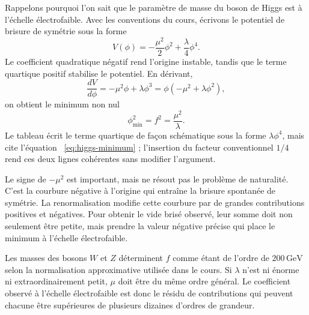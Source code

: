 \begin{classroomqa}
\end{classroomqa}

Rappelons pourquoi l’on sait que le paramètre de masse du boson de Higgs est à l’échelle électrofaible. Avec les conventions du cours, écrivons le potentiel de brisure de symétrie sous la forme
\begin{equation}
V(\phi)=-\frac{\mu^2}{2}\phi^2+\frac{\lambda}{4}\phi^4.
\label{eq:higgs-potential}
\end{equation}
Le coefficient quadratique négatif rend l’origine instable, tandis que le terme quartique positif stabilise le potentiel. En dérivant,
\begin{equation}
\frac{dV}{d\phi}=-\mu^2\phi+\lambda\phi^3
=\phi(-\mu^2+\lambda\phi^2),
\end{equation}
on obtient le minimum non nul
\begin{equation}
\phi_{\min}^2=f^2=\frac{\mu^2}{\lambda}.
\label{eq:higgs-minimum}
\end{equation}
Le tableau écrit le terme quartique de façon schématique sous la forme \(\lambda\phi^4\), mais cite l’équation ~\eqref{eq:higgs-minimum} ; l’insertion du facteur conventionnel \(1/4\) rend ces deux lignes cohérentes sans modifier l’argument.

Le signe de \(-\mu^2\) est important, mais ne résout pas le problème de naturalité. C’est la courbure négative à l’origine qui entraîne la brisure spontanée de symétrie. La renormalisation modifie cette courbure par de grandes contributions positives et négatives. Pour obtenir le vide brisé observé, leur somme doit non seulement être petite, mais prendre la valeur négative précise qui place le minimum à l’échelle électrofaible.

Les masses des bosons \(W\) et \(Z\) déterminent \(f\) comme étant de l’ordre de \(200\,\mathrm{GeV}\) selon la normalisation approximative utilisée dans le cours. Si \(\lambda\) n’est ni énorme ni extraordinairement petit, \(\mu\) doit être du même ordre général. Le coefficient observé à l’échelle électrofaible est donc le résidu de contributions qui peuvent chacune être supérieures de plusieurs dizaines d’ordres de grandeur.

